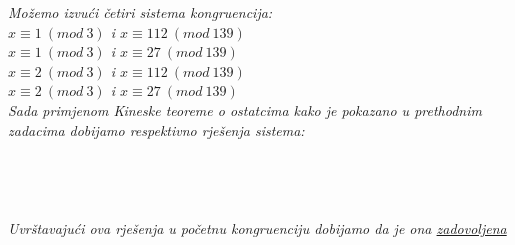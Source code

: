 \documentclass[12pt]{article}
\begin{document}
\begin{enumerate}
\begin{center}
         \textit{ Možemo izvući četiri sistema kongruencija:\\$x \equiv 1\ (mod\ 3)$ i $x \equiv 112\ (mod\ 139)$\\$x \equiv 1\ (mod\ 3)$ i $x \equiv 27\ (mod\ 139)$\\$x \equiv 2\ (mod\ 3)$ i $x \equiv 112\ (mod\ 139)$\\$x \equiv 2\ (mod\ 3)$ i $x \equiv 27\ (mod\ 139)$\\}
                           \vspace*{0.25cm}
        \textit{Sada primjenom Kineske teoreme o ostatcima kako je pokazano u prethodnim zadacima dobijamo respektivno rješenja sistema:\\
        \\ \vspace{0.15cm}
        \\ \vspace{0.15cm}
        \\ \vspace{0.15cm}
        \\ \vspace{0.15cm}
        }
        \textit{Uvrštavajući ova rješenja u početnu kongruenciju dobijamo da je ona \underline{zadovoljena}\\}
        \vspace{0.85cm}
        

\end{center}
\end{enumerate}
\end{document}

